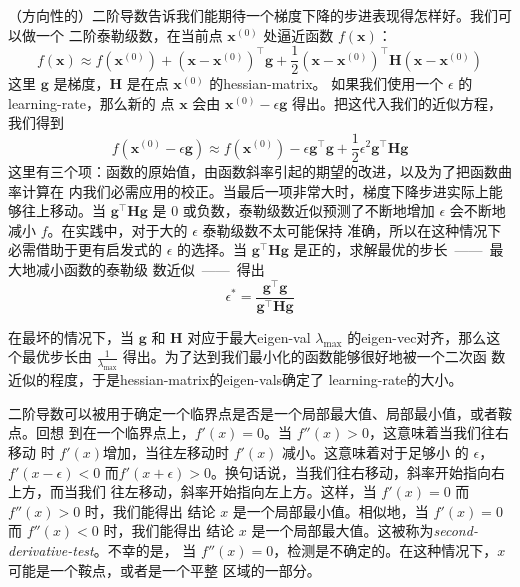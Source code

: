 （方向性的）二阶导数告诉我们能期待一个梯度下降的步进表现得怎样好。我们可以做一个
二阶泰勒级数，在当前点 $\pmb{x}^{(0)}$ 处逼近函数 $f(\pmb{x})$：
\begin{equation}
  f(\pmb{x}) \approx f(\pmb{x}^{(0)}) + (\pmb{x} - \pmb{x}^{(0)})^{\top}\pmb{g} + \frac{1}{2}(\pmb{x} - \pmb{x}^{(0)})^{\top}\pmb{H}(\pmb{x} - \pmb{x}^{(0)})
\end{equation}
这里 $\pmb{g}$ 是梯度，$\pmb{H}$ 是在点 $\pmb{x}^{(0)}$ 的\gls*{hessian-matrix}。
如果我们使用一个 $\epsilon$ 的\gls*{learning-rate}，那么新的
点 $\pmb{x}$ 会由 $\pmb{x}^{(0)} - \epsilon\pmb{g}$ 得出。把这代入我们的近似方程，
我们得到
\begin{equation}
  f(\pmb{x}^{(0)} - \epsilon\pmb{g}) \approx f(\pmb{x}^{(0)}) - \epsilon\pmb{g}^{\top}\pmb{g} + \frac{1}{2}\epsilon^2\pmb{g}^{\top}\pmb{H}\pmb{g}
\end{equation}
这里有三个项：函数的原始值，由函数斜率引起的期望的改进，以及为了把函数曲率计算在
内我们必需应用的校正。当最后一项非常大时，梯度下降步进实际上能够往上移动。当
$\pmb{g}^{\top}\pmb{H}\pmb{g}$ 是 $0$ 或负数，泰勒级数近似预测了不断地增加
$\epsilon$ 会不断地减小 $f$。在实践中，对于大的 $\epsilon$ 泰勒级数不太可能保持
准确，所以在这种情况下必需借助于更有启发式的 $\epsilon$ 的选择。当
$\pmb{g}^{\top}\pmb{H}\pmb{g}$ 是正的，求解最优的步长~——~最大地减小函数的泰勒级
数近似~——~得出
\begin{equation}
  \epsilon^* = \frac{\pmb{g}^{\top}\pmb{g}}{\pmb{g}^{\top}\pmb{H}\pmb{g}}
\end{equation}

在最坏的情况下，当 $\pmb{g}$ 和 $\pmb{H}$ 对应于最大\gls*{eigen-val}
$\lambda_{\max}$ 的\gls*{eigen-vec}对齐，那么这个最优步长由
$\frac{1}{\lambda_{\max}}$ 得出。为了达到我们最小化的函数能够很好地被一个二次函
数近似的程度，于是\gls*{hessian-matrix}的\gls*{eigen-vals}确定了
\gls*{learning-rate}的大小。

二阶导数可以被用于确定一个临界点是否是一个局部最大值、局部最小值，或者鞍点。回想
到在一个临界点上，$f'(x) = 0$。当 $f''(x) > 0$，这意味着当我们往右移动
时 $f'(x)$增加，当往左移动时 $f'(x)$ 减小。这意味着对于足够小
的 $\epsilon$，$f'(x - \epsilon) < 0$
而$f'(x + \epsilon) > 0$。换句话说，当我们往右移动，斜率开始指向右上方，而当我们
往左移动，斜率开始指向左上方。这样，当 $f'(x) = 0$ 而 $f''(x) > 0$ 时，我们能得出
结论 $x$ 是一个局部最小值。相似地，当 $f'(x) = 0$ 而 $f''(x) < 0$ 时，我们能得出
结论 $x$ 是一个局部最大值。这被称为\emph{\gls{second-derivative-test}}。不幸的是，
当 $f''(x) = 0$，检测是不确定的。在这种情况下，$x$ 可能是一个鞍点，或者是一个平整
区域的一部分。

